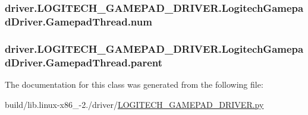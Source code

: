 \subsubsection[{num}]{\setlength{\rightskip}{0pt plus 5cm}driver.\+L\+O\+G\+I\+T\+E\+C\+H\+\_\+\+G\+A\+M\+E\+P\+A\+D\+\_\+\+D\+R\+I\+V\+E\+R.\+Logitech\+Gamepad\+Driver.\+Gamepad\+Thread.\+num}\label{classdriver_1_1LOGITECH__GAMEPAD__DRIVER_1_1LogitechGamepadDriver_1_1GamepadThread_a01174be3f4261cd2dc0510a95907ae24}
\hypertarget{classdriver_1_1LOGITECH__GAMEPAD__DRIVER_1_1LogitechGamepadDriver_1_1GamepadThread_abede3a32608fc0d308e1cebcbd507eef}{}
\subsubsection[{parent}]{\setlength{\rightskip}{0pt plus 5cm}driver.\+L\+O\+G\+I\+T\+E\+C\+H\+\_\+\+G\+A\+M\+E\+P\+A\+D\+\_\+\+D\+R\+I\+V\+E\+R.\+Logitech\+Gamepad\+Driver.\+Gamepad\+Thread.\+parent}\label{classdriver_1_1LOGITECH__GAMEPAD__DRIVER_1_1LogitechGamepadDriver_1_1GamepadThread_abede3a32608fc0d308e1cebcbd507eef}


The documentation for this class was generated from the following file\+:\begin{DoxyCompactItemize}
\item 
build/lib.\+linux-\/x86\+\_-\/2./driver/\hyperlink{build_2lib_8linux-x86__64-2_87_2driver_2LOGITECH__GAMEPAD__DRIVER_8py}{L\+O\+G\+I\+T\+E\+C\+H\+\_\+\+G\+A\+M\+E\+P\+A\+D\+\_\+\+D\+R\+I\+V\+E\+R.\+py}\end{DoxyCompactItemize}
